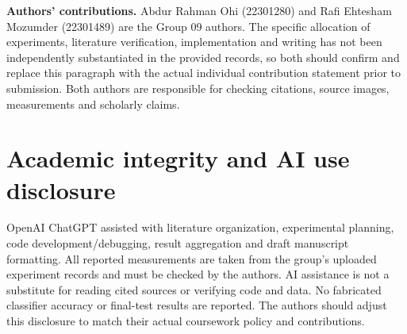 \documentclass[sigconf,nonacm]{acmart}
\begin{document}
\textbf{Authors' contributions.} Abdur Rahman Ohi (22301280) and Rafi Ehtesham Mozumder (22301489) are the Group 09 authors. The specific allocation of experiments, literature verification, implementation and writing has not been independently substantiated in the provided records, so both should confirm and replace this paragraph with the actual individual contribution statement prior to submission. Both authors are responsible for checking citations, source images, measurements and scholarly claims.

\section*{Academic integrity and AI use disclosure}
OpenAI ChatGPT assisted with literature organization, experimental planning, code development/debugging, result aggregation and draft manuscript formatting. All reported measurements are taken from the group's uploaded experiment records and must be checked by the authors. AI assistance is not a substitute for reading cited sources or verifying code and data. No fabricated classifier accuracy or final-test results are reported. The authors should adjust this disclosure to match their actual coursework policy and contributions.



\clearpage
\appendix

\end{document}
